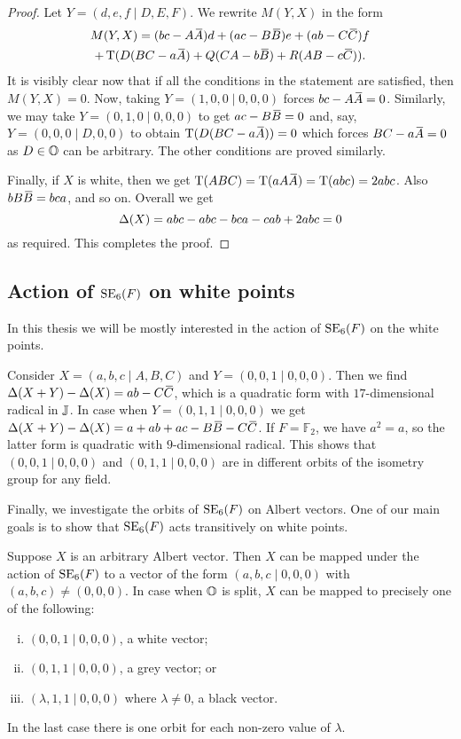 \begin{proof}
	Let $Y = (d,e,f\mid D,E,F)$. We rewrite $M(Y,X)$ in the form
	\begin{multline*}
		M(Y,X) = (bc - A \ovA)d + (ac - B \ovB) e + (ab - C \ovC) f \\
			+ \Tr(D(BC-a\ovA) + Q(CA - b\ovB) + R(AB - c\ovC)).
	\end{multline*}
It is visibly clear now that if all the conditions in the statement are satisfied,
then $M(Y,X) = 0$. Now, taking $Y = (1,0,0\mid 0,0,0)$ forces
$bc-A\mathord{\mbox{\hspace*{0pt}}\,\overline{\!A\!\!\;}\!\:}\mbox{\hspace*{0pt}} = 0$. Similarly, we may take $Y = (0,1,0\mid 0,0,0)$ to get 
$ac - B\mathord{\mbox{\hspace*{0pt}}\,\overline{\!B\!\!\;}\!\:}\mbox{\hspace*{0pt}} = 0$ and, say, $Y = (0,0,0\mid D,0,0)$ to obtain
$\operatorname{T}(D(BC - a\mathord{\mbox{\hspace*{0pt}}\,\overline{\!A\!\!\;}\!\:}\mbox{\hspace*{0pt}})) = 0$ which forces $BC - a\mathord{\mbox{\hspace*{0pt}}\,\overline{\!A\!\!\;}\!\:}\mbox{\hspace*{0pt}} = 0$ as $D \in \mathbb{O}$ can
be arbitrary. The other conditions are proved similarly.

Finally, if $X$ is white, then we get $\operatorname{T}(ABC) = \operatorname{T}(a A\mathord{\mbox{\hspace*{0pt}}\,\overline{\!A\!\!\;}\!\:}\mbox{\hspace*{0pt}}) = \operatorname{T}(abc) = 2abc$. 
Also $b B\mathord{\mbox{\hspace*{0pt}}\,\overline{\!B\!\!\;}\!\:}\mbox{\hspace*{0pt}} = bca$, and so on. Overall we get 
\begin{equation*}
	\Delta(X) = abc - abc - bca - cab + 2abc = 0
\end{equation*}
as required. This completes the proof.
\end{proof}

\subsection{Action of $\mathrm{SE}_6(F)$ on white points}

In this thesis we will be mostly interested in the action of $\mathrm{SE}_6(F)$ on the 
white points. 

Consider $X = (a,b,c\mid A,B,C)$ and $Y = (0,0,1\mid 0,0,0)$. Then we find 
\mbox{$\Delta(X+Y) - \Delta(X) = ab - C\mathord{\mbox{\hspace*{0pt}}\,\overline{\!C\!\!\;}\!\:}\mbox{\hspace*{0pt}}$}, which is a quadratic form with 
\mbox{$17$-dimensional} radical in $\mathbb{J}$. In case when $Y = (0,1,1\mid 0,0,0)$ we get
$\Delta(X+Y) - \Delta(X) = a+ab+ac-B\ovB-C\ovC$. If $F = \mathbb{F}_2$, 
we have $a^2 = a$, so the latter form is quadratic with $9$-dimensional radical. This
shows that $(0,0,1\mid 0,0,0)$ and $(0,1,1\mid 0,0,0)$ are in different orbits 
of the isometry group for any field.

Finally, we investigate the orbits of $\mathrm{SE}_6(F)$ on Albert vectors. One of our main
goals is to show that $\mathrm{SE}_6(F)$ acts transitively on white points. 

\begin{lemma}
	Suppose $X$ is an arbitrary Albert vector. Then $X$ can be mapped under the action
	of $\mathrm{SE}_6(F)$ to a vector of the form $(a,b,c\mid 0,0,0)$ with $(a,b,c) \neq 
	(0,0,0)$. In case when $\mathbb{O}$ is split, $X$ can be mapped to precisely one of the
	 following:
	\begin{enumerate}[(i)]
		\item $(0,0,1\mid 0,0,0)$, a white vector;
		\item $(0,1,1\mid 0,0,0)$, a grey vector; or
		\item $(\lambda,1,1\mid 0,0,0)$ where $\lambda \neq 0$, a black vector.
	\end{enumerate}
	In the last case there is one orbit for each non-zero value of $\lambda$. 
\end{lemma}

